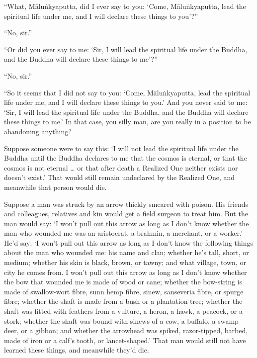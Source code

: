 \documentclass[12pt,openany]{book}%
\begin{document}
“What, \textsanskrit{Māluṅkyaputta}, did I ever say to you: ‘Come, \textsanskrit{Māluṅkyaputta}, lead the spiritual life under me, and I will declare these things to you’?” 

“No, sir.” 

“Or did you ever say to me: ‘Sir, I will lead the spiritual life under the Buddha, and the Buddha will declare these things to me’?” 

“No, sir.” 

“So it seems that I did not say to you: ‘Come, \textsanskrit{Māluṅkyaputta}, lead the spiritual life under me, and I will declare these things to you.’ And you never said to me: ‘Sir, I will lead the spiritual life under the Buddha, and the Buddha will declare these things to me.’ In that case, you silly man, are you really in a position to be abandoning anything? 

Suppose someone were to say this: ‘I will not lead the spiritual life under the Buddha until the Buddha declares to me that the cosmos is eternal, or that the cosmos is not eternal … or that after death a Realized One neither exists nor doesn’t exist.’ That would still remain undeclared by the Realized One, and meanwhile that person would die. 

Suppose a man was struck by an arrow thickly smeared with poison. His friends and colleagues, relatives and kin would get a field surgeon to treat him. But the man would say: ‘I won’t pull out this arrow as long as I don’t know whether the man who wounded me was an aristocrat, a brahmin, a merchant, or a worker.’ He’d say: ‘I won’t pull out this arrow as long as I don’t know the following things about the man who wounded me: his name and clan; whether he’s tall, short, or medium; whether his skin is black, brown, or tawny; and what village, town, or city he comes from. I won’t pull out this arrow as long as I don’t know whether the bow that wounded me is made of wood or cane; whether the bow-string is made of swallow-wort fibre, sunn hemp fibre, sinew, sanseveria fibre, or spurge fibre; whether the shaft is made from a bush or a plantation tree; whether the shaft was fitted with feathers from a vulture, a heron, a hawk, a peacock, or a stork; whether the shaft was bound with sinews of a cow, a buffalo, a swamp deer, or a gibbon; and whether the arrowhead was spiked, razor-tipped, barbed, made of iron or a calf’s tooth, or lancet-shaped.’ That man would still not have learned these things, and meanwhile they’d die. 
\end{document}
